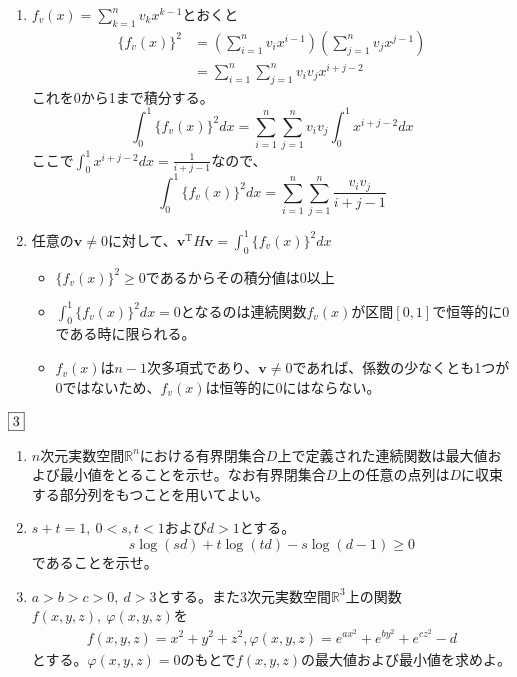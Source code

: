 \documentclass[dvipdfmx]{jsreport}
\newcommand{\R}{\mathbb{R}}
\renewcommand{\phi}{\varphi} %
\newcounter{num}[section]
\begin{document}
\begin{answer}
\begin{enumerate}
	\item $f_v(x)= \sum_{k= 1}^n v_kx^{k- 1}$とおくと
\begin{align*}
	\{f_v(x)\}^2
	&= \left(\sum_{i= 1}^n v_ix^{i- 1}\right)\left(\sum_{j= 1}^n v_jx^{j- 1}\right)\\
	&= \sum_{i= 1}^n\sum_{j= 1}^n v_iv_j x^{i+ j- 2}
\end{align*}
	これを0から1まで積分する。
\begin{equation*}
	\int_0^1\{f_v(x)\}^2 dx= \sum_{i= 1}^n \sum_{j= 1}^n v_iv_j \int_0^1 x^{i+ j-2} dx
\end{equation*}
	ここで$\int_0^1 x^{i+ j- 2} dx= \frac{1}{i+ j- 1}$なので、
\begin{equation*}
	\int_0^1\{f_v(x)\}^2 dx= \sum_{i= 1}^n \sum_{j= 1}^n\frac{v_iv_j}{i+ j- 1}
\end{equation*}

	\item 任意の$\bm{v}\ne 0$に対して、$\bm{v}^\mathrm{T}H\bm{v}= \int_0^1 \{f_v(x)\}^2 dx$
\begin{itemize}
	\item $\{f_v(x)\}^2\ge 0$であるからその積分値は0以上
	\item  $\int_0^1 \{f_v(x)\}^2 dx= 0$となるのは連続関数$f_v(x)$が区間$[0, 1]$で恒等的に0である時に限られる。
	\item $f_v(x)$は$n- 1$次多項式であり、$\bm{v}\ne 0$であれば、係数の少なくとも1つが0ではないため、$f_v(x)$は恒等的に0にはならない。
\end{itemize}


\end{enumerate}
\end{answer}

\begin{tcolorbox} %
	$\fbox{3}$
\begin{enumerate}
	\item $n$次元実数空間$\R^n$における有界閉集合$D$上で定義された連続関数は最大値および最小値をとることを示せ。なお有界閉集合$D$上の任意の点列は$D$に収束する部分列をもつことを用いてよい。
	\item $s+ t= 1,\ 0< s, t< 1$および$d> 1$とする。
\begin{equation*}
	s\log{(sd)}+ t\log{(td)}- s\log{(d- 1)}\ge 0
\end{equation*}
	であることを示せ。

	\item $a> b> c> 0,\ d> 3$とする。また3次元実数空間$\R^3$上の関数$f(x, y, z),\ \phi(x, y, z)$を
\begin{align*}
	f(x, y, z)= x^2+ y^2+ z^2,
	\phi(x, y, z)= e^{ax^2}+ e^{by^2}+ e^{cz^2}- d
\end{align*}
	とする。$\phi(x, y, z)= 0$のもとで$f(x, y, z)$の最大値および最小値を求めよ。
\end{enumerate}
\end{tcolorbox}
\end{document}
